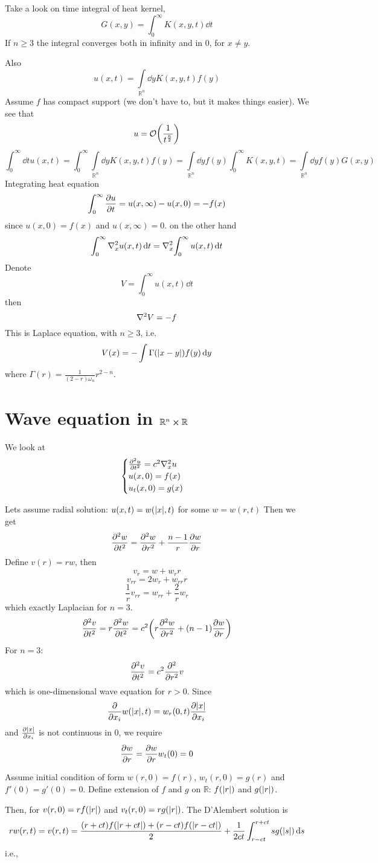 Take a look on time integral of heat kernel,
$$G(x,y) = \int_0^\infty K(x,y,t) \dd{t}$$
If $n\geq 3$ the integral converges both in infinity and in 0, for $x\neq y$.

Also
$$u(x,t) = \int\limits_{\mathbb{R}^n} \dd{y} K(x,y,t) f(y) $$
Assume $f$ has compact support (we don't have to, but it makes things easier). We see that
$$u = \order{\frac{1}{t^{\frac{n}{2}}}}$$
$$\int_0^\infty \dd{t} u(x,t) = \int_0^\infty  \int\limits_{\mathbb{R}^n}\dd{y} K(x,y,t) f(y) =  \int\limits_{\mathbb{R}^n}\dd{y}  f(y)  \int_0^\infty K(x,y,t) =\int\limits_{\mathbb{R}^n}\dd{y}  f(y)G(x,y) $$
Integrating heat equation
$$\int_0^\infty \pdv{u}{t} = u(x,\infty) - u(x,0) = -f(x)$$
since $u(x,0)=f(x)$ and $u(x,\infty)=0$.
on the other hand
$$\int_0^\infty \laplacian_x{u(x,t)} \dd{t} = \laplacian_x{\int_0^\infty u(x,t) \dd{t}}$$
Denote 
$$V = \int_0^\infty u(x,t) \dd{t}$$
then
$$\laplacian{V} = -f$$
This is Laplace equation, with $n\geq 3$, i.e.
$$V(x) = -\int \Gamma\qty(\abs{x-y}) f(y) \dd{y}$$
where $\Gamma(r) = \frac{1}{(2-r)\omega_n}r^{2-n}$.
\section{Wave equation in $\mathbb{R}^n \cross \mathbb{R}$}
We look at
$$\begin{cases}
\pdv[2]{u}{t} = c^2\laplacian_x{u}\\
	u(x,0) = f(x)\\
	u_t(x,0) = g(x)
\end{cases}$$

Lets assume radial solution: 
$u(x,t) = w(\abs{x},t)$ for some $w = w(r,t)$
Then we get
$$\pdv[2]{w}{t} = \pdv[2]{w}{r} + \frac{n-1}{r} \pdv{w}{r}$$
Define $v(r) = rw$, then
$$v_r= w + w_rr$$
$$v_{rr} = 2w_r+w_{rr}r$$
$$\frac{1}{r} v_{rr} = w_{rr} + \frac{2}{r} w_r$$
which exactly Laplacian for $n=3$.
$$\pdv[2]{v}{t} = r \pdv[2]{w}{t} =c^2\qty( r \pdv[2]{w}{r} + (n-1)\pdv{w}{r})$$
For $n=3$:
$$\pdv[2]{v}{t} = c^2\pdv[2]{r} v$$
which is one-dimensional wave equation for $r>0$. Since
$$\pdv{x_i} w(\abs{x},t ) = w_r(0,t) \pdv{\abs{x}}{x_i}$$
 and $ \pdv{\abs{x}}{x_i}$ is not continuous in 0, we require
 $$\pdv{w}{r} (0) = \pdv{w}{r} w_t(0) = 0$$
 
Assume  initial condition of form $w(r,0)=f(r)$, $w_t(r,0) = g(r)$ and $f'(0)=g'(0)=0$. Define extension of $f$ and $g$ on $\mathbb{R}$: $f(\abs{r})$ and $g(\abs{r})$.

Then, for $v(r,0) = rf(\abs{r})$ and $v_t(r,0) = rg(\abs{r})$.
The D'Alembert solution is
$$rw(r,t) = v(r,t) = \frac{(r+ct)f(\abs{r+ct})+ (r-ct)f(\abs{r-ct})}{2} + \frac{1}{2ct} \int_{r-ct}^{r+ct} sg(\abs{s}) \dd{s}$$ 
i.e.,

